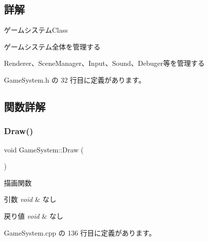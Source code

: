 \subsection{詳解}
ゲームシステム\+Class 

ゲームシステム全体を管理する

Renderer、\+Scene\+Manager、\+Input、\+Sound、\+Debuger等を管理する 

 Game\+System.\+h の 32 行目に定義があります。



\subsection{関数詳解}
\mbox{\label{class_game_system_a474db0066b23d39e94e0a830140edce5}} 
\subsubsection{\texorpdfstring{Draw()}{Draw()}}
{\footnotesize\ttfamily void Game\+System\+::\+Draw (\begin{DoxyParamCaption}{ }\end{DoxyParamCaption})}



描画関数 


\begin{DoxyParams}{引数}
{\em void} & なし \\
\hline
\end{DoxyParams}

\begin{DoxyRetVals}{戻り値}
{\em void} & なし \\
\hline
\end{DoxyRetVals}


 Game\+System.\+cpp の 136 行目に定義があります。

